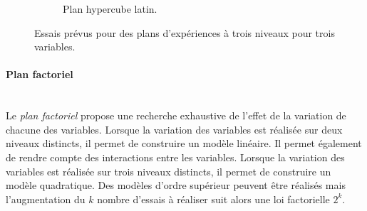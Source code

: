 \begin{figure}[hbtp]
\begin{subfigure}[b]{0.30\textwidth}
{
        }
        \newline
        \newline
        \caption{Plan hypercube latin.}
        \label{fig:doe_hls}
    \end{subfigure}
    \caption{Essais prévus pour des plans d'expériences à trois niveaux pour trois variables.}
    \label{fig:doe}
\end{figure}

\paragraph{Plan factoriel}\mbox{\label{parag:doe_factorial}} \\
Le \textit{plan factoriel} propose une recherche exhaustive de l'effet de la variation de chacune des variables.
Lorsque la variation des variables est réalisée sur deux niveaux distincts, il permet de construire un modèle linéaire.
Il permet également de rendre compte des interactions entre les variables.
Lorsque la variation des variables est réalisée sur trois niveaux distincts, il permet de construire un modèle quadratique.
Des modèles d'ordre supérieur peuvent être réalisés mais l'augmentation du $k$ nombre d'essais à réaliser suit alors une loi factorielle $2^k$.

